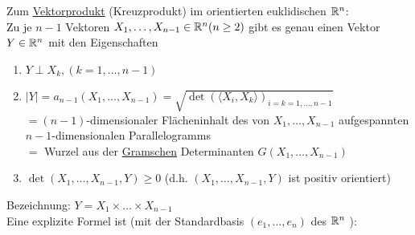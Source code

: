 Zum \uline{Vektorprodukt} (Kreuzprodukt) im orientierten euklidischen \(\mathbb{R}^n\): \\
  Zu je \(n-1\) Vektoren \(X_1, \dots, X_{n-1} \in \mathbb{R}^n (n\ge 2)\) gibt es genau einen Vektor \(Y\in \mathbb{R}^n\) mit den Eigenschaften
  \begin{enumerate}
   \item \(Y \perp X_k, (k = 1, \dots, n-1) \)
   \item \(|Y|=a_{n-1}(X_1, \dots, X_{n-1}) = \sqrt{\det\left(\langle X_i, X_k \rangle\right)_{i=k=1,\dots,n-1}} \) \\
	  \(= (n-1)\)-dimensionaler Flächeninhalt des von \(X_1, \dots, X_{n-1}\) aufgespannten \(n-1\)-dimensionalen Parallelogramms \\
	  \(=\) Wurzel aus der \uline{Gramschen} Determinanten \(G(X_1,\dots, X_{n-1})\)
   \item \(\det (X_1, \dots, X_{n-1}, Y) \ge 0\) (d.h. \((X_1, \dots, X_{n-1}, Y)\) ist positiv orientiert)
  \end{enumerate}
Bezeichnung: \(Y=X_1 \times \dots \times X_{n-1}\) \\
Eine explizite Formel ist (mit der Standardbasis \((e_1, \dots , e_n)\) des \(\mathbb{R}^n\) ): 
